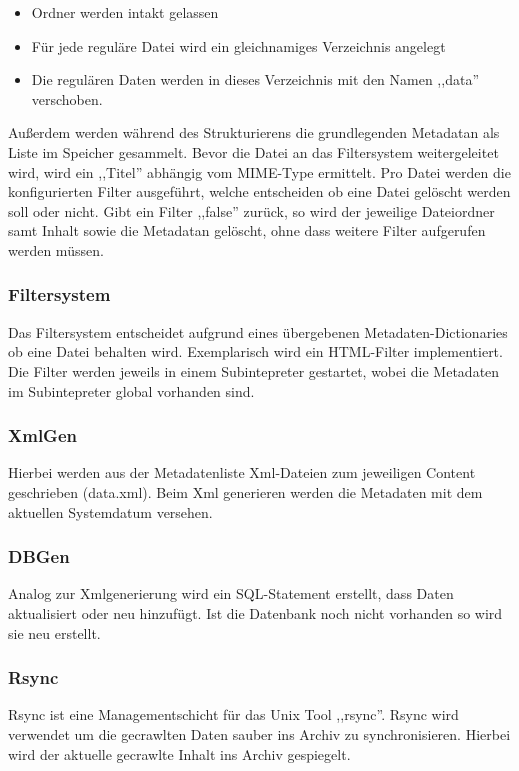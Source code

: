 \begin{itemize}
    \item Ordner werden intakt gelassen
    \item Für jede reguläre Datei wird ein gleichnamiges Verzeichnis angelegt
    \item Die regulären Daten werden in dieses Verzeichnis mit den Namen ,,data'' verschoben.
\end{itemize}

Außerdem werden während des Strukturierens die grundlegenden Metadatan als Liste im Speicher gesammelt.
Bevor die Datei an das Filtersystem weitergeleitet wird, wird ein ,,Titel'' abhängig vom MIME-Type ermittelt.
Pro Datei werden die konfigurierten Filter ausgeführt, welche entscheiden ob eine Datei gelöscht werden soll oder nicht.
Gibt ein Filter ,,false'' zurück, so wird der jeweilige Dateiordner samt Inhalt sowie die Metadatan gelöscht,
ohne dass weitere Filter aufgerufen werden müssen.

\subsubsection{Filtersystem}
\label{ssub:filtersystem}
Das Filtersystem entscheidet aufgrund eines übergebenen Metadaten-Dictionaries ob eine Datei behalten wird. Exemplarisch wird ein HTML-Filter
implementiert. Die Filter werden jeweils in einem Subintepreter gestartet, wobei die Metadaten im Subintepreter global vorhanden sind.


\subsubsection{XmlGen}
\label{ssub:xmlgen}
Hierbei werden aus der Metadatenliste Xml-Dateien zum jeweiligen Content geschrieben (data.xml). 
Beim Xml generieren werden die Metadaten mit dem aktuellen Systemdatum versehen.


\subsubsection{DBGen}
\label{ssub:dbgen}
Analog zur Xmlgenerierung wird ein SQL-Statement erstellt, dass Daten aktualisiert oder neu hinzufügt.
Ist die Datenbank noch nicht vorhanden so wird sie neu erstellt.


\subsubsection{Rsync}
\label{ssub:rsync}
Rsync ist eine Managementschicht für das Unix Tool ,,rsync''. Rsync wird verwendet um die gecrawlten Daten sauber ins Archiv zu synchronisieren.
Hierbei wird der aktuelle gecrawlte Inhalt ins Archiv gespiegelt. 


